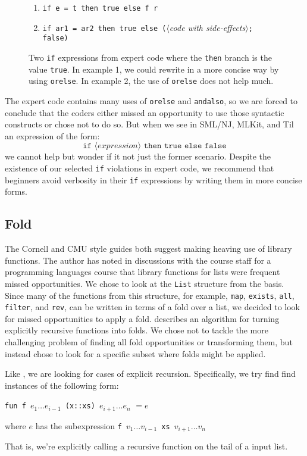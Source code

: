 \documentclass[12pt,abstracton]{scrartcl}
\begin{document}
\begin{figure}[h!]
\begin{enumerate}
\item \texttt{if e = t then true else f r}
\item \texttt{if ar1 = ar2 then true else (}$\langle$\emph{code with side-effects}$\rangle$\texttt{; false)}
\end{enumerate}
\caption{Two \texttt{if} expressions from expert code where the \texttt{then} branch is the value \texttt{true}. In example 1, we could
rewrite in a more concise way by using \texttt{orelse}. In example 2, the use of \texttt{orelse} does not help much.}
\label{figure:ifthentrue}
\end{figure}

The expert code contains many uses of \texttt{orelse} and \texttt{andalso}, so we are forced to
conclude that the coders either missed an opportunity to use those syntactic constructs or chose
not to do so. But when we see in SML/NJ, MLKit, and Til an expression of the form:
\[\texttt{if }\langle expression\rangle\texttt{ then true else false}\]
we cannot help but wonder if it not just the former scenario. Despite the existence of
our selected \texttt{if} violations in expert code, we
recommend that beginners avoid verbosity in their \texttt{if} expressions by writing them
in more concise forms.
\subsection{Fold}\label{subsec:fold}
The Cornell and CMU style guides both suggest making heaving use of library functions.
The author has noted in discussions with the course staff for a programming languages course
that library functions for lists were frequent missed opportunities. We
chose to look at the \texttt{List} structure from the basis. Since many of the functions
from this structure, for example, \texttt{map}, \texttt{exists}, \texttt{all}, \texttt{filter},
and \texttt{rev}, can be written in terms of a fold over a list, we decided to look
for missed opportunities to apply a fold. \cite{Jeu13} describes an algorithm for turning
explicitly recursive functions into folds. We chose not to tackle the more challenging
problem of finding all fold opportunities or transforming them,
but instead chose to look for a specific subset where folds might be applied.

Like \cite{Jeu13}, we are looking for cases of explicit recursion. Specifically, we try find
find instances of the following form:
\begin{center}
\texttt{fun f }\(e_{1}\ldots e_{i-1}\)\texttt{ (x::xs) }\(e_{i+1}\ldots e_{n}\) \(= e\)

where $e$ has the subexpression \texttt{f }\(v_{1}\ldots v_{i-1}\)\texttt{ xs }\(v_{i+1}\ldots v_{n}\)
\end{center}
That is, we're explicitly calling a recursive function on the tail of a input list.
\end{document}
